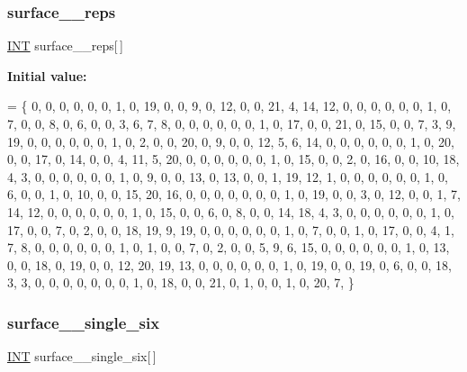 \mbox{\label{surface__23_8_c_aa6f70166b6aba7b9ee5528e74b376ae5}} 
\subsubsection{\texorpdfstring{surface\+\_\+\_\+reps}{surface\_23\_reps}}
{\footnotesize\ttfamily \mbox{\hyperlink{galois_8h_a09fddde158a3a20bd2dcadb609de11dc}{I\+NT}} surface\+\_\+\_\+reps\mbox{[}$\,$\mbox{]}}

{\bfseries Initial value\+:}
\begin{DoxyCode}
= \{
    0, 0, 0, 0, 0, 0, 1, 0, 19, 0, 0, 9, 0, 12, 0, 0, 21, 4, 14, 12, 
    0, 0, 0, 0, 0, 0, 1, 0, 7, 0, 0, 8, 0, 6, 0, 0, 3, 6, 7, 8, 
    0, 0, 0, 0, 0, 0, 1, 0, 17, 0, 0, 21, 0, 15, 0, 0, 7, 3, 9, 19, 
    0, 0, 0, 0, 0, 0, 1, 0, 2, 0, 0, 20, 0, 9, 0, 0, 12, 5, 6, 14, 
    0, 0, 0, 0, 0, 0, 1, 0, 20, 0, 0, 17, 0, 14, 0, 0, 4, 11, 5, 20, 
    0, 0, 0, 0, 0, 0, 1, 0, 15, 0, 0, 2, 0, 16, 0, 0, 10, 18, 4, 3, 
    0, 0, 0, 0, 0, 0, 1, 0, 9, 0, 0, 13, 0, 13, 0, 0, 1, 19, 12, 1, 
    0, 0, 0, 0, 0, 0, 1, 0, 6, 0, 0, 1, 0, 10, 0, 0, 15, 20, 16, 0, 
    0, 0, 0, 0, 0, 0, 1, 0, 19, 0, 0, 3, 0, 12, 0, 0, 1, 7, 14, 12, 
    0, 0, 0, 0, 0, 0, 1, 0, 15, 0, 0, 6, 0, 8, 0, 0, 14, 18, 4, 3, 
    0, 0, 0, 0, 0, 0, 1, 0, 17, 0, 0, 7, 0, 2, 0, 0, 18, 19, 9, 19, 
    0, 0, 0, 0, 0, 0, 1, 0, 7, 0, 0, 1, 0, 17, 0, 0, 4, 1, 7, 8, 
    0, 0, 0, 0, 0, 0, 1, 0, 1, 0, 0, 7, 0, 2, 0, 0, 5, 9, 6, 15, 
    0, 0, 0, 0, 0, 0, 1, 0, 13, 0, 0, 18, 0, 19, 0, 0, 12, 20, 19, 13, 
    0, 0, 0, 0, 0, 0, 1, 0, 19, 0, 0, 19, 0, 6, 0, 0, 18, 3, 3, 0, 
    0, 0, 0, 0, 0, 0, 1, 0, 18, 0, 0, 21, 0, 1, 0, 0, 1, 0, 20, 7, 
\}
\end{DoxyCode}
\mbox{\label{surface__23_8_c_abfe25c60f050c5cddead25b28481c0fd}} 
\subsubsection{\texorpdfstring{surface\+\_\+\_\+single\+\_\+six}{surface\_23\_single\_six}}
{\footnotesize\ttfamily \mbox{\hyperlink{galois_8h_a09fddde158a3a20bd2dcadb609de11dc}{I\+NT}} surface\+\_\+\_\+single\+\_\+six\mbox{[}$\,$\mbox{]}}

